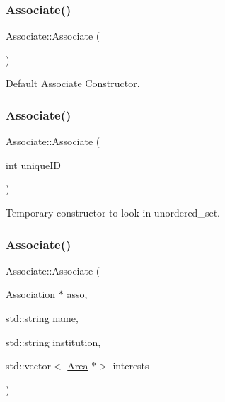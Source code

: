 \subsubsection{\texorpdfstring{Associate()}{Associate()}\hspace{0.1cm}{\footnotesize\ttfamily [1/5]}}
{\footnotesize\ttfamily Associate\+::\+Associate (\begin{DoxyParamCaption}{ }\end{DoxyParamCaption})}



Default \mbox{\hyperlink{classAssociate}{Associate}} Constructor. 

\mbox{\label{classAssociate_abe5c3e0d0f938dd44924e9d488aad870}} 
\subsubsection{\texorpdfstring{Associate()}{Associate()}\hspace{0.1cm}{\footnotesize\ttfamily [2/5]}}
{\footnotesize\ttfamily Associate\+::\+Associate (\begin{DoxyParamCaption}\item[{int}]{unique\+ID }\end{DoxyParamCaption})}



Temporary constructor to look in unordered\+\_\+set. 

\mbox{\label{classAssociate_ad27f76fd03a10e75d1b2660e60ba009f}} 
\subsubsection{\texorpdfstring{Associate()}{Associate()}\hspace{0.1cm}{\footnotesize\ttfamily [3/5]}}
{\footnotesize\ttfamily Associate\+::\+Associate (\begin{DoxyParamCaption}\item[{\mbox{\hyperlink{classAssociation}{Association}} $\ast$}]{asso,  }\item[{std\+::string}]{name,  }\item[{std\+::string}]{institution,  }\item[{std\+::vector$<$ \mbox{\hyperlink{classArea}{Area}} $\ast$$>$}]{interests }\end{DoxyParamCaption})}



